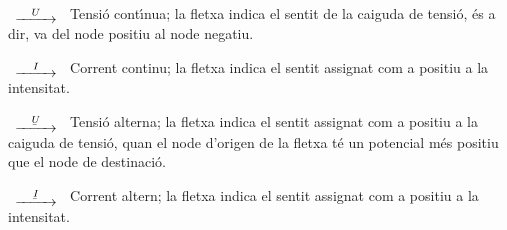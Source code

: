 \begin{list}{}
{\setlength{\labelwidth}{15mm} \setlength{\leftmargin}{25mm}
\setlength{\labelsep}{10mm}}
    \item[$\begin{CD} @>U>> \end{CD}$] Tensi\'{o} cont\'{\i}nua; la fletxa indica el sentit
    de la caiguda de tensi\'{o}, \'{e}s a dir, va del node positiu al node negatiu.
    \item[$\begin{CD} @>I>> \end{CD}$] Corrent
    continu; la fletxa indica el sentit  assignat com a positiu a la
    intensitat.
    \item[$\begin{CD} @>\cmplx{U}>> \end{CD}$] Tensi\'{o} alterna; la fletxa indica el
    sentit assignat com a positiu a la caiguda de tensi\'{o}, quan el node d'origen de la fletxa
    t\'{e} un potencial  m\'{e}s positiu que el node de destinaci\'{o}.
    \item[$\begin{CD} @>\cmplx{I}>> \end{CD}$] Corrent altern; la fletxa
    indica el sentit  assignat com a positiu a la
    intensitat.
\end{list}
